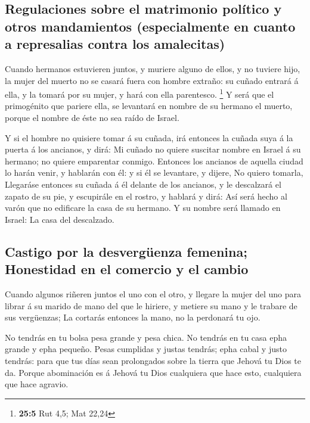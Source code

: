 \hypertarget{regulaciones-sobre-el-matrimonio-poluxedtico-y-otros-mandamientos-especialmente-en-cuanto-a-represalias-contra-los-amalecitas}{%
\subsection{Regulaciones sobre el matrimonio político y otros
mandamientos (especialmente en cuanto a represalias contra los
amalecitas)}\label{regulaciones-sobre-el-matrimonio-poluxedtico-y-otros-mandamientos-especialmente-en-cuanto-a-represalias-contra-los-amalecitas}}

 Cuando hermanos estuvieren juntos, y muriere alguno de
ellos, y no tuviere hijo, la mujer del muerto no se casará fuera con
hombre extraño: su cuñado entrará á ella, y la tomará por su mujer, y
hará con ella parentesco. \footnote{\textbf{25:5} Rut 4,5; Mat 22,24}
 Y será que el primogénito que pariere ella, se levantará en
nombre de su hermano el muerto, porque el nombre de éste no sea raído de
Israel.

 Y si el hombre no quisiere tomar á su cuñada, irá entonces
la cuñada suya á la puerta á los ancianos, y dirá: Mi cuñado no quiere
suscitar nombre en Israel á su hermano; no quiere emparentar conmigo.
 Entonces los ancianos de aquella ciudad lo harán venir, y
hablarán con él: y si él se levantare, y dijere, No quiero tomarla,
 Llegaráse entonces su cuñada á él delante de los ancianos,
y le descalzará el zapato de su pie, y escupirále en el rostro, y
hablará y dirá: Así será hecho al varón que no edificare la casa de su
hermano.  Y su nombre será llamado en Israel: La casa del
descalzado.

\hypertarget{castigo-por-la-desverguxfcenza-femenina-honestidad-en-el-comercio-y-el-cambio}{%
\subsection{Castigo por la desvergüenza femenina; Honestidad en el
comercio y el
cambio}\label{castigo-por-la-desverguxfcenza-femenina-honestidad-en-el-comercio-y-el-cambio}}

 Cuando algunos riñeren juntos el uno con el otro, y
llegare la mujer del uno para librar á su marido de mano del que le
hiriere, y metiere su mano y le trabare de sus vergüenzas; 
La cortarás entonces la mano, no la perdonará tu ojo.

 No tendrás en tu bolsa pesa grande y pesa chica.
 No tendrás en tu casa epha grande y epha pequeño.
 Pesas cumplidas y justas tendrás; epha cabal y justo
tendrás: para que tus días sean prolongados sobre la tierra que Jehová
tu Dios te da.  Porque abominación es á Jehová tu Dios
cualquiera que hace esto, cualquiera que hace agravio.

